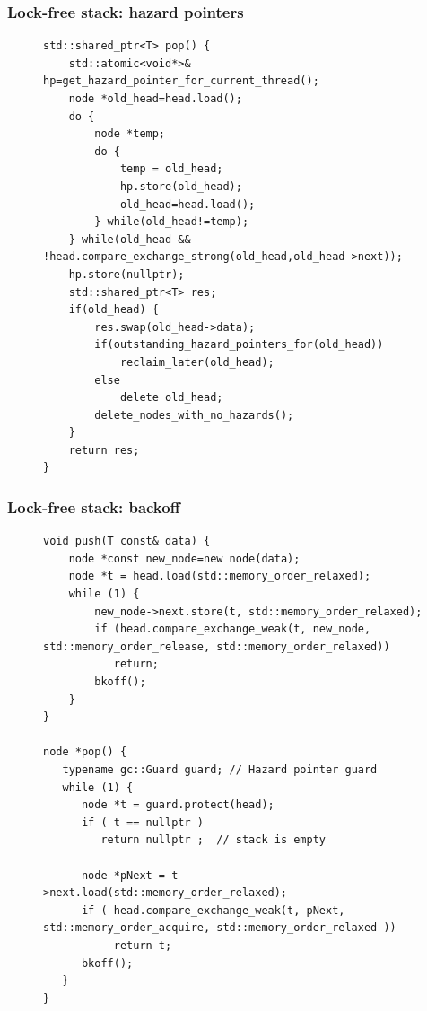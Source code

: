 \documentclass[aspectratio=169, pdf, 8pt, unicode]{beamer}
\begin{document}
\begin{frame}[fragile]
\frametitle{Lock-free stack: hazard pointers}
\begin{figure}[H]
\begin{minipage}{0.8\textwidth}
\small
\begin{verbatim}
std::shared_ptr<T> pop() {
    std::atomic<void*>& hp=get_hazard_pointer_for_current_thread();
    node *old_head=head.load();
    do {
        node *temp;
        do {
            temp = old_head;
            hp.store(old_head);
            old_head=head.load();
        } while(old_head!=temp);
    } while(old_head && !head.compare_exchange_strong(old_head,old_head->next));
    hp.store(nullptr);
    std::shared_ptr<T> res;
    if(old_head) {
        res.swap(old_head->data);
        if(outstanding_hazard_pointers_for(old_head))
            reclaim_later(old_head);
        else
            delete old_head;
        delete_nodes_with_no_hazards();
    }
    return res;
}
\end{verbatim}
\end{minipage}
\end{figure}
\end{frame}

\begin{frame}[fragile]
\frametitle{Lock-free stack: backoff}
\begin{figure}[H]
\begin{minipage}{0.8\textwidth}
\small
\begin{verbatim}
void push(T const& data) {
    node *const new_node=new node(data);
    node *t = head.load(std::memory_order_relaxed);
    while (1) {
        new_node->next.store(t, std::memory_order_relaxed);
        if (head.compare_exchange_weak(t, new_node, std::memory_order_release, std::memory_order_relaxed))
           return;
        bkoff();
    }
}

node *pop() {
   typename gc::Guard guard; // Hazard pointer guard
   while (1) {
      node *t = guard.protect(head);
      if ( t == nullptr )
         return nullptr ;  // stack is empty

      node *pNext = t->next.load(std::memory_order_relaxed);
      if ( head.compare_exchange_weak(t, pNext, std::memory_order_acquire, std::memory_order_relaxed ))
           return t;
      bkoff();
   }
}
\end{verbatim}
\end{minipage}
\end{figure}
\end{frame}
\end{document}
